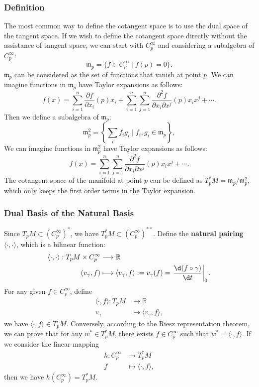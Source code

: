 \documentclass{report}
\begin{document}
\subsubsection{Definition}
The most common way to define the cotangent space is to use the dual space of the tangent space.
If we wish to define the cotangent space directly without the assistance of tangent space, we can start with $C^\infty_p$ and considering a subalgebra of $C^\infty_p$:
\[
    \mathfrak{m}_p=\{f\in C^\infty_p\mid f(p)=0\}.
\]
$\mathfrak{m}_p$ can be considered as the set of functions that vanish at point $p$. We can imagine functions in $\mathfrak{m}_p$ have Taylor expansions as follows:
\[
    f(x)=\sum_{i=1}^n\frac{\partial f}{\partial x_i}(p)x_i+\sum_{i=1}^n\sum_{j=1}^n\frac{\partial^2 f}{\partial x_i\partial x^j}(p)x_ix^j+\cdots.
\] 
Then we define a subalgebra of $\mathfrak{m}_p$:
\[
    \mathfrak{m}^2_p=\left\{\sum_if_ig_i\mid f_i, g_i\in \mathfrak{m}_p\right\},
\]
We can imagine functions in $\mathfrak{m}_p^2$ have Taylor expansions as follows:
\[
    f(x)=\sum_{i=1}^n\sum_{j=1}^n\frac{\partial^2 f}{\partial x_i\partial x^j}(p)x_ix^j+\cdots.
\] 
The cotangent space of the manifold at point $p$ can be defined as $T_p^*M=\mathfrak{m}_p/\mathfrak{m}^2_p$, which only keeps the first order terms in the Taylor expansion.

\subsubsection{Dual Basis of the Natural Basis}
Since $T_pM\subset \left(C^\infty_p\right)^*$, we have $T_p^*M\subset \left(C^\infty_p\right)^{**}$. Define the \textbf{natural pairing} $\langle\cdot,\cdot\rangle$, which is a bilinear function:
\[
    \begin{aligned}
    \langle\cdot,\cdot\rangle:T_pM\times C^\infty_p&\longrightarrow\mathbb{R}\\
    (v_\gamma,f)&\longmapsto\langle v_\gamma,f\rangle:=v_\gamma(f)=\left.\frac{\d(f\circ \gamma)}{\d t}\right|_{0}.
    \end{aligned}
\]
For any given $f\in C^\infty_p$, define
\[
    \begin{aligned}
        \langle\cdot,f\rangle:T_pM&\longrightarrow\mathbb{R}\\
        v_\gamma&\longmapsto\langle v_\gamma,f\rangle,
    \end{aligned}
\]
we have $\langle\cdot,f\rangle\in T_pM$. Conversely, according to the Riesz representation theorem, we can prove that for any $w^*\in T_p^*M$, there exists $f\in C^\infty_p$ such that $w^*=\langle\cdot,f\rangle$. If we consider the linear mapping
\[
    \begin{aligned}
        h:C^\infty_p&\longrightarrow T_p^*M\\
        f&\longmapsto\langle\cdot,f\rangle,
    \end{aligned}
\]
then we have $h(C^\infty_p)=T_p^*M$.
\end{document}
